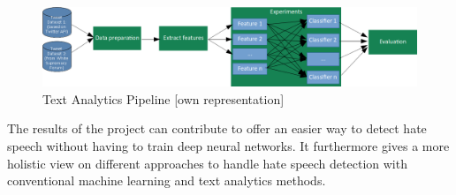 \begin{figure}[]
	\centering
	\includegraphics[width=1.0\textwidth]{./pipeline.png}	
	\caption{Text Analytics Pipeline [own representation]}
	\label{fig:pipeline}
\end{figure}

The results of the project can contribute to offer an easier way to detect hate speech without having to train deep neural networks. It furthermore gives a more holistic view on different approaches to handle hate speech detection with conventional machine learning and text analytics methods.


